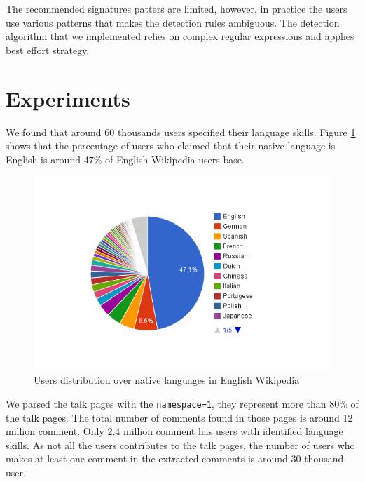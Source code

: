\documentclass[11pt]{article}
\begin{document}
The recommended signatures patters are limited, however, in practice the users
use various patterns that makes the detection rules ambiguous. The detection
algorithm that we implemented relies on complex regular expressions and applies best effort strategy.

\section{Experiments}
\label{exps}
We found that around 60 thousands users specified their language skills. Figure \ref{native_dist} shows that the percentage of users who claimed that their native language is English is around 47\% of English Wikipedia users base.

\begin{figure}[htp]
\includegraphics[scale=0.56]{chart_4.png}
\caption{Users distribution over native languages in English Wikipedia}
\label{native_dist}
\end{figure}

We parsed the talk pages with the \verb+namespace=1+, they represent more than
80\% of the talk pages. The total number of comments found in those pages is
around 12 million comment. Only 2.4 million comment has users with identified language skills. As not all the users contributes to the talk pages, the number of users who makes at least one comment in the extracted comments is around 30 thousand user.
\end{document}
